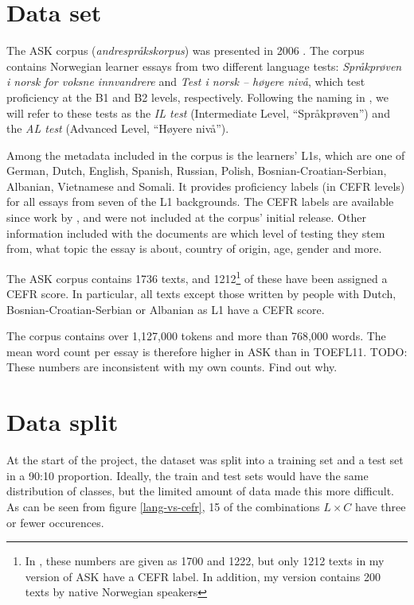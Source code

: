 \section{Data set}

The ASK corpus (\emph{andrespråkskorpus}) was presented in 2006
\autocite{tenfjord06}. The corpus contains Norwegian learner essays from two
different language tests: \emph{Språkprøven i norsk for voksne innvandrere}
and \emph{Test i norsk – høyere nivå}, which test proficiency at the B1 and
B2 levels, respectively. Following the naming in
\textcite{carlsen2012proficiency}, we will refer to these tests as the
\emph{IL test} (Intermediate Level, ``Språkprøven'') and the \emph{AL test}
(Advanced Level, ``Høyere nivå'').

Among the metadata included in the corpus is the
learners' L1s, which are one of German, Dutch, English, Spanish, Russian,
Polish, Bosnian-Croatian-Serbian, Albanian, Vietnamese and Somali. It
provides proficiency labels (in CEFR levels) for all essays from seven of the
L1 backgrounds. The CEFR labels are available since work by
\textcite{carlsen2012proficiency}, and were not included at the corpus'
initial release. Other information included with the documents are which
level of testing they stem from, what topic the essay is about, country of
origin, age, gender and more.

The ASK corpus contains 1736 texts, and 1212\footnote{In
\textcite{carlsen2012proficiency}, these numbers are given as 1700 and 1222,
but only 1212 texts in my version of ASK have a CEFR label. In addition, my
version contains 200 texts by native Norwegian speakers} of these have been
assigned a CEFR score. In particular, all texts except those written by
people with Dutch, Bosnian-Croatian-Serbian or Albanian as L1 have a CEFR
score.

The corpus contains over 1,127,000 tokens and more than 768,000 words. The
mean word count per essay is therefore higher in ASK than in TOEFL11. TODO:
These numbers are inconsistent with my own counts. Find out why.


\section{Data split}

At the start of the project, the dataset was split into a training set and a
test set in a 90:10 proportion. Ideally, the train and test sets would have
the same distribution of classes, but the limited amount of data made this
more difficult. As can be seen from figure \ref{lang-vs-cefr}, 15 of the
combinations \(L\times C\) have three or fewer occurences.

